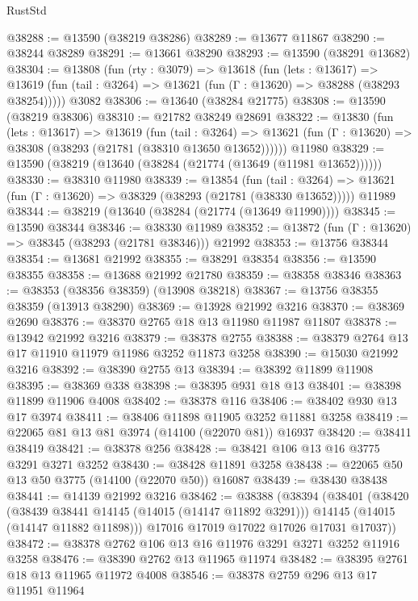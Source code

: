 \begin{lexlean}{RustStd}
\begin{coremodule}
@38288 := @13590 (@38219 @38286)
@38289 := @13677 @11867
@38290 := @38244 @38289
@38291 := @13661 @38290
@38293 := @13590 (@38291 @13682)
@38304 := @13808
    (fun (rty : @3079) =>
    @13618
      (fun (lets : @13617) =>
      @13619 (fun (tail : @3264) => @13621 (fun (Γ : @13620) => @38288 (@38293 @38254)))))
    @3082
@38306 := @13640 (@38284 @21775)
@38308 := @13590 (@38219 @38306)
@38310 := @21782 @38249 @28691
@38322 := @13830
    (fun (lets : @13617) =>
    @13619
      (fun (tail : @3264) =>
      @13621 (fun (Γ : @13620) => @38308 (@38293 (@21781 (@38310 @13650 @13652))))))
    @11980
@38329 := @13590 (@38219 (@13640 (@38284 (@21774 (@13649 (@11981 @13652))))))
@38330 := @38310 @11980
@38339 := @13854
    (fun (tail : @3264) => @13621 (fun (Γ : @13620) => @38329 (@38293 (@21781 (@38330 @13652)))))
    @11989
@38344 := @38219 (@13640 (@38284 (@21774 (@13649 @11990))))
@38345 := @13590 @38344
@38346 := @38330 @11989
@38352 := @13872 (fun (Γ : @13620) => @38345 (@38293 (@21781 @38346))) @21992
@38353 := @13756 @38344
@38354 := @13681 @21992
@38355 := @38291 @38354
@38356 := @13590 @38355
@38358 := @13688 @21992 @21780
@38359 := @38358 @38346
@38363 := @38353 (@38356 @38359) (@13908 @38218)
@38367 := @13756 @38355 @38359 (@13913 @38290)
@38369 := @13928 @21992 @3216
@38370 := @38369 @2690
@38376 := @38370 @2765 @18 @13 @11980 @11987 @11807
@38378 := @13942 @21992 @3216
@38379 := @38378 @2755
@38388 := @38379 @2764 @13 @17 @11910 @11979 @11986 @3252 @11873 @3258
@38390 := @15030 @21992 @3216
@38392 := @38390 @2755 @13
@38394 := @38392 @11899 @11908
@38395 := @38369 @338
@38398 := @38395 @931 @18 @13
@38401 := @38398 @11899 @11906 @4008
@38402 := @38378 @116
@38406 := @38402 @930 @13 @17 @3974
@38411 := @38406 @11898 @11905 @3252 @11881 @3258
@38419 := @22065 @81 @13 @81 @3974 (@14100 (@22070 @81)) @16937
@38420 := @38411 @38419
@38421 := @38378 @256
@38428 := @38421 @106 @13 @16 @3775 @3291 @3271 @3252
@38430 := @38428 @11891 @3258
@38438 := @22065 @50 @13 @50 @3775 (@14100 (@22070 @50)) @16087
@38439 := @38430 @38438
@38441 := @14139 @21992 @3216
@38462 := @38388
    (@38394
      (@38401
        (@38420
          (@38439 @38441 @14145 (@14015 (@14147 @11892 @3291)))
          @14145
          (@14015 (@14147 @11882 @11898)))
        @17016
        @17019
        @17022
        @17026
        @17031
        @17037))
@38472 := @38378 @2762 @106 @13 @16 @11976 @3291 @3271 @3252 @11916 @3258
@38476 := @38390 @2762 @13 @11965 @11974
@38482 := @38395 @2761 @18 @13 @11965 @11972 @4008
@38546 := @38378
    @2759
    @296
    @13
    @17
    @11951
    @11964

\end{coremodule}
\end{lexlean}
